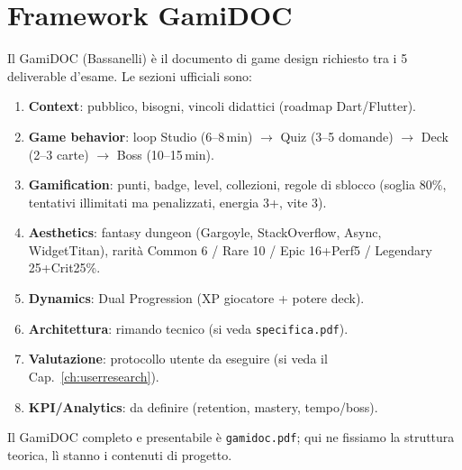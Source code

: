 \chapter{Framework GamiDOC}
\label{ch:fgamidoc}
Il GamiDOC (Bassanelli) è il documento di game design richiesto tra i 5
deliverable d'esame. Le sezioni ufficiali sono:

\begin{enumerate}
\item \textbf{Context}: pubblico, bisogni, vincoli didattici (roadmap Dart/Flutter).
\item \textbf{Game behavior}: loop Studio (6--8\,min) $\rightarrow$ Quiz
(3--5 domande) $\rightarrow$ Deck (2--3 carte) $\rightarrow$ Boss (10--15\,min).
\item \textbf{Gamification}: punti, badge, level, collezioni, regole di
sblocco (soglia 80\%, tentativi illimitati ma penalizzati, energia 3+, vite 3).
\item \textbf{Aesthetics}: fantasy dungeon (Gargoyle, StackOverflow, Async,
WidgetTitan), rarità Common 6 / Rare 10 / Epic 16+Perf5 / Legendary 25+Crit25\%.
\item \textbf{Dynamics}: Dual Progression (XP giocatore + potere deck).
\item \textbf{Architettura}: rimando tecnico (si veda \texttt{specifica.pdf}).
\item \textbf{Valutazione}: protocollo utente da eseguire (si veda il
Cap.~\ref{ch:userresearch}).
\item \textbf{KPI/Analytics}: da definire (retention, mastery, tempo/boss).
\end{enumerate}

Il GamiDOC completo e presentabile è \texttt{gamidoc.pdf}; qui ne fissiamo
la struttura teorica, lì stanno i contenuti di progetto.
